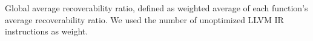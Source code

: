 \label{fig:CS-debug-ratio} Global average recoverability ratio, defined as weighted average of each function's average recoverability ratio. We used the number of unoptimized LLVM IR instructions as weight.